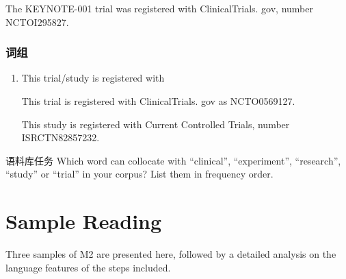 \documentclass[a4paper]{ctexbook}
\begin{document}
    \begin{eg}{}
      The KEYNOTE-001 trial was registered with ClinicalTrials. gov, number NCTOI295827.  
    \end{eg}

    \subsubsection{词组}

    \begin{enumerate}
      \item This trial/study is registered with
      \begin{eg}{}
        This trial is registered with ClinicalTrials. gov as NCTO0569127.
      \end{eg}

      \begin{eg}{}
        This study is registered with Current Controlled Trials, number ISRCTN82857232.
      \end{eg}
    \end{enumerate}

    \begin{task}{语料库任务}
      Which word can collocate with ``clinical'', ``experiment'', ``research'', ``study'' or ``trial'' in your corpus? List them in frequency order.
    \end{task}

\section{Sample Reading}

Three samples of M2 are presented here, followed by a detailed analysis on the language features of the steps included.
\end{document}

